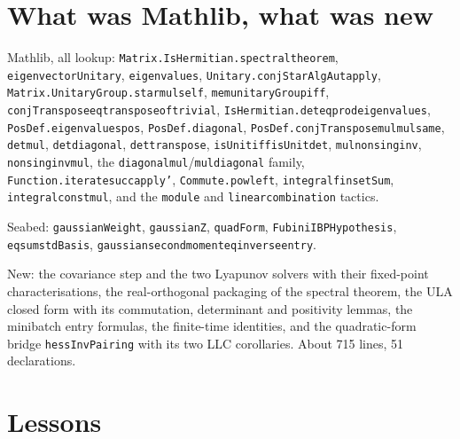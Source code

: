 \documentclass[11pt]{article}
\newcommand{\code}[1]{{\def\_{\textunderscore\allowbreak}\texttt{#1}}}
\begin{document}
\section{What was Mathlib, what was new}

{\raggedright Mathlib, all lookup: \code{Matrix.IsHermitian.spectral\_theorem},
\code{eigenvectorUnitary}, \code{eigenvalues},
\code{Unitary.conjStarAlgAut\_apply}, \code{Matrix.UnitaryGroup.star\_mul\_self},
\code{mem\_unitaryGroup\_iff}, \code{conjTranspose\_eq\_transpose\_of\_trivial},
\code{IsHermitian.det\_eq\_prod\_eigenvalues}, \code{PosDef.eigenvalues\_pos},
\code{PosDef.diagonal}, \code{PosDef.conjTranspose\_mul\_mul\_same},
\code{det\_mul}, \code{det\_diagonal}, \code{det\_transpose},
\code{isUnit\_iff\_isUnit\_det}, \code{mul\_nonsing\_inv},
\code{nonsing\_inv\_mul}, the \code{diagonal\_mul}/\code{mul\_diagonal}
family, \code{Function.iterate\_succ\_apply'}, \code{Commute.pow\_left},
\code{integral\_finsetSum}, \code{integral\_const\_mul}, and the
\code{module} and \code{linear\_combination} tactics.\par}

Seabed: \code{gaussianWeight}, \code{gaussianZ}, \code{quadForm},
\code{FubiniIBPHypothesis}, \code{eq\_sum\_stdBasis},
\code{gaussian\_second\_moment\_eq\_inverse\_entry}.

{\raggedright New: the covariance step and the two Lyapunov solvers with their
fixed-point characterisations, the real-orthogonal packaging of the
spectral theorem, the ULA closed form with its commutation, determinant
and positivity lemmas, the minibatch entry formulas, the finite-time
identities, and the quadratic-form bridge \code{hessInvPairing} with its
two LLC corollaries. About 715 lines, 51 declarations.\par}

\section{Lessons}
\end{document}
